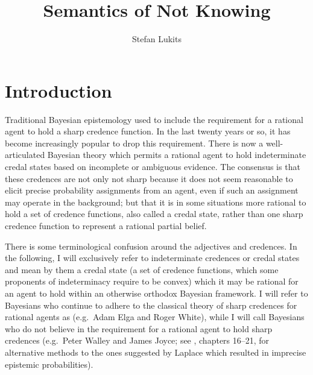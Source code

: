 \documentclass[11pt]{article}
\begin{document}

\title{Semantics of Not Knowing}
\author{Stefan Lukits}
\date{}
\maketitle


\section{Introduction}
\label{Introduction}

Traditional Bayesian epistemology used to include the requirement for
a rational agent to hold a sharp credence function. In the last twenty
years or so, it has become increasingly popular to drop this
requirement. There is now a well-articulated Bayesian theory which
permits a rational agent to hold indeterminate credal states based on
incomplete or ambiguous evidence. The consensus is that these
credences are not only not sharp because it does not seem reasonable
to elicit precise probability assignments from an agent, even if such
an assignment may operate in the background; but that it is in some
situations more rational to hold a set of credence functions, also
called a credal state, rather than one sharp credence function to
represent a rational partial belief. 

There is some terminological confusion around the adjectives
  and  credences.
In the following, I will exclusively refer to indeterminate credences
or credal states and mean by them a credal state (a set of credence
functions, which some proponents of indeterminacy require to be
convex) which it may be rational for an agent to hold within an
otherwise orthodox Bayesian framework. I will refer to Bayesians who
continue to adhere to the classical theory of sharp credences for
rational agents as  (e.g.\ Adam Elga and Roger
White), while I will call Bayesians who do not believe in the
requirement for a rational agent to hold sharp credences
 (e.g.\ Peter Walley and James Joyce; see
, chapters 16--21, for alternative methods to the
ones suggested by Laplace which resulted in imprecise epistemic
probabilities).

\end{document}
